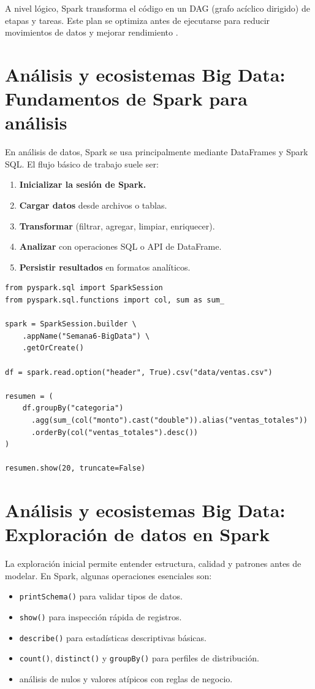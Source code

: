 \documentclass[12pt]{article}
\begin{document}
A nivel lógico, Spark transforma el código en un DAG (grafo acíclico dirigido) de etapas y tareas. Este plan se optimiza antes de ejecutarse para reducir movimientos de datos y mejorar rendimiento \cite{spark_sql_guide}.

\section{Análisis y ecosistemas Big Data: Fundamentos de Spark para análisis}
En análisis de datos, Spark se usa principalmente mediante DataFrames y Spark SQL. El flujo básico de trabajo suele ser:

\begin{enumerate}[label=\textbf{F\arabic*.}, leftmargin=*]
\item \textbf{Inicializar la sesión de Spark.}
\item \textbf{Cargar datos} desde archivos o tablas.
\item \textbf{Transformar} (filtrar, agregar, limpiar, enriquecer).
\item \textbf{Analizar} con operaciones SQL o API de DataFrame.
\item \textbf{Persistir resultados} en formatos analíticos.
\end{enumerate}

\begin{lstlisting}[style=python, caption={Ejemplo base de análisis con PySpark DataFrame}]
from pyspark.sql import SparkSession
from pyspark.sql.functions import col, sum as sum_

spark = SparkSession.builder \
    .appName("Semana6-BigData") \
    .getOrCreate()

df = spark.read.option("header", True).csv("data/ventas.csv")

resumen = (
    df.groupBy("categoria")
      .agg(sum_(col("monto").cast("double")).alias("ventas_totales"))
      .orderBy(col("ventas_totales").desc())
)

resumen.show(20, truncate=False)
\end{lstlisting}

\section{Análisis y ecosistemas Big Data: Exploración de datos en Spark}
La exploración inicial permite entender estructura, calidad y patrones antes de modelar. En Spark, algunas operaciones esenciales son:

\begin{itemize}[leftmargin=*]
\item \texttt{printSchema()} para validar tipos de datos.
\item \texttt{show()} para inspección rápida de registros.
\item \texttt{describe()} para estadísticas descriptivas básicas.
\item \texttt{count()}, \texttt{distinct()} y \texttt{groupBy()} para perfiles de distribución.
\item análisis de nulos y valores atípicos con reglas de negocio.
\end{itemize}
\end{document}
